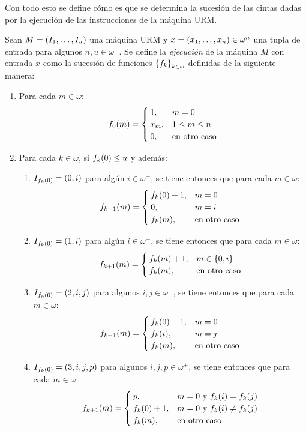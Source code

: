 Con todo esto se define cómo es que se determina la sucesión de las cintas dadas por la ejecución de las instrucciones de la máquina URM.

\begin{definition}
	\label{def:ejecucion_urm}
	Sean $M =\pa*{I_{1},\dotsc, I_{u}}$ una máquina URM y $x =\pa*{x_{1},\dotsc, x_{n}}\in\omega^{n}$ una tupla de entrada para algunos $n, u\in\omega^{+}$. Se define la \emph{ejecución} de la máquina $M$ con entrada $x$ como la sucesión de funciones $\set*{f_{k}}_{k\in\omega}$ definidas de la siguiente manera:

	\begin{enumerate}
		\item Para cada $m\in\omega$:
		\[
			f_{0}\pa*{m} =
			\begin{cases}
				1, & m = 0\\
				x_{m}, & 1\leq m\leq n\\
				0, &\text{en otro caso}
			\end{cases}
		\]
		\item Para cada $k\in\omega$, si $f_{k}\pa*{0}\leq u$ y además:

		\begin{enumerate}
			\item $I_{f_{k}\pa*{0}} =\pa*{0, i}$ para algún $i\in\omega^{+}$, se tiene entonces que para cada $m\in\omega$:
			\[
				f_{k + 1}\pa*{m} =
				\begin{cases}
					f_{k}\pa*{0} + 1, & m = 0\\
					0, & m = i\\
					f_{k}\pa*{m}, &\text{en otro caso}
				\end{cases}
			\]
			\item $I_{f_{k}\pa*{0}} =\pa*{1, i}$ para algún $i\in\omega^{+}$, se tiene entonces que para cada $m\in\omega$:
			\[
				f_{k + 1}\pa*{m} =
				\begin{cases}
					f_{k}\pa*{m} + 1, & m\in\set*{0, i}\\
					f_{k}\pa*{m}, &\text{en otro caso}
				\end{cases}
			\]
			\item $I_{f_{k}\pa*{0}} =\pa*{2, i, j}$ para algunos $i, j\in\omega^{+}$, se tiene entonces que para cada $m\in\omega$:
			\[
				f_{k + 1}\pa*{m} =
				\begin{cases}
					f_{k}\pa*{0} + 1, & m = 0\\
					f_{k}\pa*{i}, & m = j\\
					f_{k}\pa*{m}, &\text{en otro caso}
				\end{cases}
			\]
			\item $I_{f_{k}\pa*{0}} =\pa*{3, i, j, p}$ para algunos $i, j, p\in\omega^{+}$, se tiene entonces que para cada $m\in\omega$:
			\[
				f_{k + 1}\pa*{m} =
				\begin{cases}
					p, & m = 0\text{ y } f_{k}\pa*{i} = f_{k}\pa*{j}\\
					f_{k}\pa*{0} + 1, & m = 0\text{ y } f_{k}\pa*{i}\neq f_{k}\pa*{j}\\
					f_{k}\pa*{m}, &\text{en otro caso}
				\end{cases}
			\]
		\end{enumerate}


\end{enumerate}
\end{definition}
